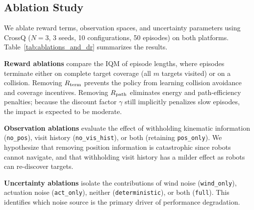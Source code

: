 \documentclass{article}
\begin{document}

\subsection{Ablation Study}
\label{sec:exp:ablation}

We ablate reward terms, observation spaces, and uncertainty parameters using CrossQ ($N=3$, 3 seeds, 10 configurations, 50 episodes) on both platforms. Table~\ref{tab:ablations_and_dr} summarizes the results.

\textbf{Reward ablations} compare the IQM of episode lengths, where episodes terminate either on complete target coverage (all $m$ targets visited) or on a collision. Removing $R_{\mathrm{term}}$ prevents the policy from learning collision avoidance and coverage incentives. Removing $R_{\mathrm{path}}$ eliminates energy and path-efficiency penalties; because the discount factor $\gamma$ still implicitly penalizes slow episodes, the impact is expected to be moderate.

\textbf{Observation ablations} evaluate the effect of withholding kinematic information (\texttt{no\_pos}), visit history (\texttt{no\_vis\_hist}), or both (retaining \texttt{pos\_only}). We hypothesize that removing position information is catastrophic since robots cannot navigate, and that withholding visit history has a milder effect as robots can re-discover targets.

\textbf{Uncertainty ablations} isolate the contributions of wind noise (\texttt{wind\_only}), actuation noise (\texttt{act\_only}), neither (\texttt{deterministic}), or both (\texttt{full}). This identifies which noise source is the primary driver of performance degradation.
\end{document}
